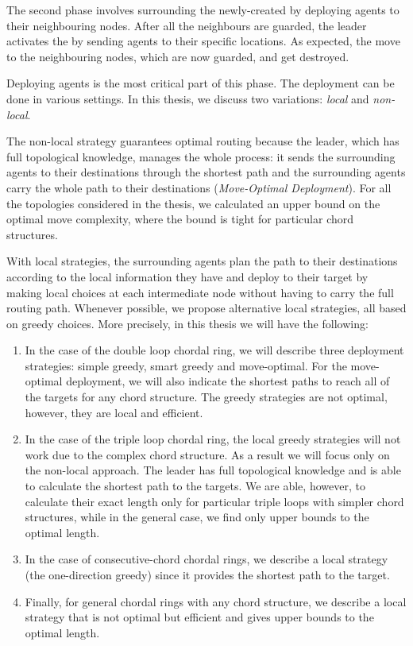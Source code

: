 The second phase involves surrounding the newly-created \bvs by deploying agents to their neighbouring nodes. After all the neighbours are guarded, the leader activates the \bvs    by sending agents to their specific locations. As expected, the \bvs move to the neighbouring nodes, which are now guarded, and get destroyed. 

Deploying agents is the most critical part of this phase. The deployment can be done in various settings. In this thesis, we discuss two variations: {\em local} and {\em non-local}. 



The non-local strategy guarantees optimal routing because  the leader, which  has  full topological knowledge,  manages the whole process:  it sends the surrounding agents to their destinations through the shortest path and  the surrounding agents carry the whole path to their destinations
  ({\em Move-Optimal Deployment}). For all the topologies considered in the thesis, we calculated an upper bound on the optimal move complexity, where the bound is tight for particular chord structures.
     
  
With local strategies,  the surrounding agents plan the path to their destinations according to the local information they have and deploy to their target   by making local choices at each intermediate node without having to carry the full routing path. Whenever possible, we propose alternative local strategies, all based on greedy choices.
More precisely, in this thesis we will have the following: 
\begin{enumerate}
\item  In the case of the double loop chordal ring, we will describe  three deployment strategies: simple greedy, smart greedy and move-optimal. For the move-optimal deployment,  we will also indicate the shortest paths to reach all of the targets for any chord structure. The greedy strategies are not optimal, however, they are local and efficient.
\item In the case of the triple loop chordal ring, the local greedy strategies will not work due to the complex chord structure. As a result we will focus only on the non-local approach. The  leader has full topological knowledge and is able to calculate  the shortest path to the targets. We are able, however,  to calculate their exact length  only for particular triple loops with simpler chord structures, while in the general case, we find only  upper bounds to the optimal length.
\item In the case of consecutive-chord chordal rings, we describe a local strategy (the one-direction greedy) since it provides the shortest path to the target.  
\item Finally, for general chordal rings with any chord structure, we describe a local strategy that is  not optimal but efficient and gives upper bounds to the optimal length. 
\end{enumerate}










